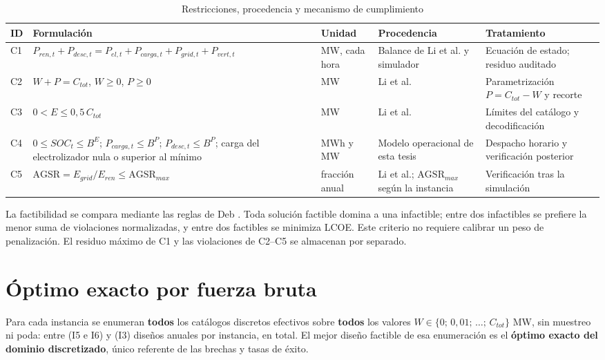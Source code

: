 \begin{table}[H]
\centering
\scriptsize
\caption{Restricciones, procedencia y mecanismo de cumplimiento}
\label{tab:restricciones}
\renewcommand{\arraystretch}{1.22}
\begin{tabular}{@{}p{0.6cm} p{4.3cm} p{2.2cm} p{2.2cm} p{3.0cm}@{}}
\hline
\textbf{ID} & \textbf{Formulación} & \textbf{Unidad} & \textbf{Procedencia} & \textbf{Tratamiento} \\
\hline
C1 & $P_{ren,t}+P_{desc,t}=P_{el,t}+P_{carga,t}+P_{grid,t}+P_{vert,t}$ & MW, cada hora & Balance de Li et al. y simulador & Ecuación de estado; residuo auditado \\
C2 & $W+P=C_{tot}$, $W\geq0$, $P\geq0$ & MW & Li et al. & Parametrización $P=C_{tot}-W$ y recorte \\
C3 & $0<E\leq0{,}5\,C_{tot}$ & MW & Li et al. & Límites del catálogo y decodificación \\
C4 & $0\leq SOC_t\leq B^E$; $P_{carga,t}\leq B^P$; $P_{desc,t}\leq B^P$; carga del electrolizador nula o superior al mínimo & MWh y MW & Modelo operacional de esta tesis & Despacho horario y verificación posterior \\
C5 & $\mathrm{AGSR}=E_{grid}/E_{ren}\leq\mathrm{AGSR}_{max}$ & fracción anual & Li et al.; $\mathrm{AGSR}_{max}$ según la instancia & Verificación tras la simulación \\
\hline
\end{tabular}
\end{table}

La factibilidad se compara mediante las reglas de Deb \cite{Deb2000Constraint}. Toda solución factible domina a una infactible; entre dos infactibles se prefiere la menor suma de violaciones normalizadas, y entre dos factibles se minimiza LCOE. Este criterio no requiere calibrar un peso de penalización. El residuo máximo de C1 y las violaciones de C2--C5 se almacenan por separado.

\section{Óptimo exacto por fuerza bruta}
\label{sec:fuerza_bruta}

Para cada instancia se enumeran \textbf{todos} los catálogos discretos efectivos sobre \textbf{todos} los valores $W\in\{0;\,0{,}01;\,\ldots;\,C_{tot}\}$ MW, sin muestreo ni poda: entre \BFEDesigns{} (I5 e I6) y \BFCDesigns{} (I3) diseños anuales por instancia, \BruteForceDesignsTotal{} en total. El mejor diseño factible de esa enumeración es el \textbf{óptimo exacto del dominio discretizado}, único referente de las brechas y tasas de éxito.

